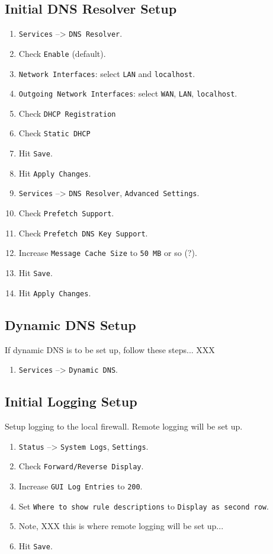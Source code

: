 \subsection{Initial DNS Resolver Setup}
\begin{enumerate}
 \item \texttt{Services} --> \texttt{DNS Resolver}.
 \item Check \texttt{Enable} (default).
 \item \texttt{Network Interfaces}: select \texttt{LAN} and \texttt{localhost}.
 \item \texttt{Outgoing Network Interfaces}: select \texttt{WAN}, \texttt{LAN}, \texttt{localhost}.
 \item Check \texttt{DHCP Registration}
 \item Check \texttt{Static DHCP}
 \item Hit \texttt{Save}.
 \item Hit \texttt{Apply Changes}.
 \item \texttt{Services} --> \texttt{DNS Resolver}, \texttt{Advanced Settings}.
 \item Check \texttt{Prefetch Support}.
 \item Check \texttt{Prefetch DNS Key Support}.
 \item Increase \texttt{Message Cache Size} to \texttt{50 MB} or so (?).
 \item Hit \texttt{Save}.
 \item Hit \texttt{Apply Changes}.
\end{enumerate}

\subsection{Dynamic DNS Setup}
If dynamic DNS is to be set up, follow these steps... XXX
\begin{enumerate}
 \item \texttt{Services} --> \texttt{Dynamic DNS}.
\end{enumerate}

\subsection{Initial Logging Setup}
Setup logging to the local firewall. Remote logging will be set up.

\begin{enumerate}
 \item \texttt{Status} --> \texttt{System Logs}, \texttt{Settings}.
 \item Check \texttt{Forward/Reverse Display}.
 \item Increase \texttt{GUI Log Entries} to \texttt{200}.
 \item Set \texttt{Where to show rule descriptions} to \texttt{Display as second row}.
 \item Note, XXX this is where remote logging will be set up... 
 \item Hit \texttt{Save}.
\end{enumerate}

